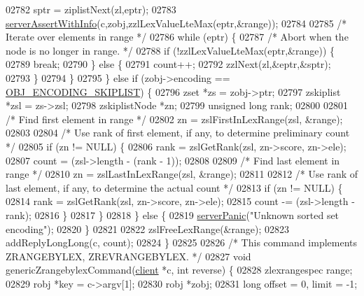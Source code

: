 \begin{DoxyCode}
02782         sptr = ziplistNext(zl,eptr);
02783         \hyperlink{server_8h_a7308f76cbff9a8d3797fe78190b91282}{serverAssertWithInfo}(c,zobj,zzlLexValueLteMax(eptr,&range));
02784 
02785         \textcolor{comment}{/* Iterate over elements in range */}
02786         \textcolor{keywordflow}{while} (eptr) \{
02787             \textcolor{comment}{/* Abort when the node is no longer in range. */}
02788             \textcolor{keywordflow}{if} (!zzlLexValueLteMax(eptr,&range)) \{
02789                 \textcolor{keywordflow}{break};
02790             \} \textcolor{keywordflow}{else} \{
02791                 count++;
02792                 zzlNext(zl,&eptr,&sptr);
02793             \}
02794         \}
02795     \} \textcolor{keywordflow}{else} \textcolor{keywordflow}{if} (zobj->encoding == \hyperlink{server_8h_acfb35db5cb30ed113ed23aeb1a224c4c}{OBJ\_ENCODING\_SKIPLIST}) \{
02796         zset *zs = zobj->ptr;
02797         zskiplist *zsl = zs->zsl;
02798         zskiplistNode *zn;
02799         \textcolor{keywordtype}{unsigned} \textcolor{keywordtype}{long} rank;
02800 
02801         \textcolor{comment}{/* Find first element in range */}
02802         zn = zslFirstInLexRange(zsl, &range);
02803 
02804         \textcolor{comment}{/* Use rank of first element, if any, to determine preliminary count */}
02805         \textcolor{keywordflow}{if} (zn != NULL) \{
02806             rank = zslGetRank(zsl, zn->score, zn->ele);
02807             count = (zsl->length - (rank - 1));
02808 
02809             \textcolor{comment}{/* Find last element in range */}
02810             zn = zslLastInLexRange(zsl, &range);
02811 
02812             \textcolor{comment}{/* Use rank of last element, if any, to determine the actual count */}
02813             \textcolor{keywordflow}{if} (zn != NULL) \{
02814                 rank = zslGetRank(zsl, zn->score, zn->ele);
02815                 count -= (zsl->length - rank);
02816             \}
02817         \}
02818     \} \textcolor{keywordflow}{else} \{
02819         \hyperlink{server_8h_a11cc378e7778a830b41240578de3b204}{serverPanic}(\textcolor{stringliteral}{"Unknown sorted set encoding"});
02820     \}
02821 
02822     zslFreeLexRange(&range);
02823     addReplyLongLong(c, count);
02824 \}
02825 
02826 \textcolor{comment}{/* This command implements ZRANGEBYLEX, ZREVRANGEBYLEX. */}
02827 \textcolor{keywordtype}{void} genericZrangebylexCommand(\hyperlink{structclient}{client} *c, \textcolor{keywordtype}{int} reverse) \{
02828     zlexrangespec range;
02829     robj *key = c->argv[1];
02830     robj *zobj;
02831     \textcolor{keywordtype}{long} offset = 0, limit = -1;

\end{DoxyCode}
